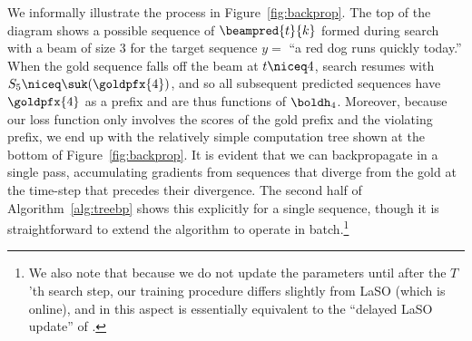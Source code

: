 We informally illustrate the process in Figure~\ref{fig:backprop}. The
top of the diagram shows a possible sequence of $\beampred{t}{k}$
formed during search with a beam of size 3 for the target sequence
$y=$ ``a red dog runs quickly today.'' When the gold sequence falls
off the beam at $t \niceq 4$, search resumes with
$S_5 \niceq \suk(\goldpfx{4})$, and so all subsequent predicted
sequences have $\goldpfx{4}$ as a prefix and are thus functions of
$\boldh_4$. Moreover, because our loss function only involves the
scores of the gold prefix and the violating prefix, we end up with the
relatively simple computation tree shown at the bottom of
Figure~\ref{fig:backprop}. It is evident that we can backpropagate
in a single pass, accumulating gradients from sequences that diverge
from the gold at the time-step that precedes their divergence. The
second half of Algorithm~\ref{alg:treebp} shows this explicitly for a
single sequence, though it is straightforward to extend the algorithm
to operate in batch.\footnote{We also note that because
  we do not update the parameters until after the $T$'th search step, our training procedure
  differs slightly from LaSO (which is online), and in this aspect is
  essentially equivalent to the ``delayed LaSO update'' of .}
